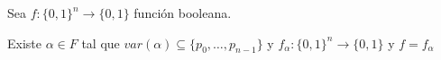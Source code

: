 \begin{teorema}{}{}
    Sea $f: {\{ 0, 1 \}}^n \to \{ 0, 1 \}$ función booleana.

    \medskip

    Existe $\alpha \in F$ tal que 
    $var(\alpha) \subseteq \{ p_0, \dotsc, p_{n-1} \}$
    y
    $f_{\alpha} : {\{ 0, 1 \}}^n \to \{ 0, 1 \}$
    y
    $f = f_{\alpha}$
\end{teorema}

